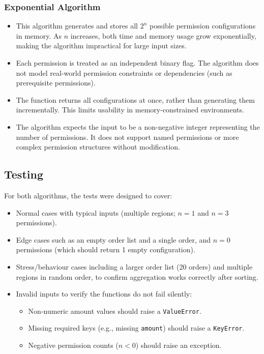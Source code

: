 \documentclass[12pt]{article}
\begin{document}
\subsubsection{Exponential Algorithm}
\begin{itemize}
	\item This algorithm generates and stores all $2^n$ possible permission configurations in memory.
	      As $n$ increases, both time and memory usage grow exponentially, making the algorithm impractical
	      for large input sizes.
	\item Each permission is treated as an independent binary flag. The algorithm does not model
	      real-world permission constraints or dependencies (such as prerequisite permissions).
	\item The function returns all configurations at once, rather than generating them incrementally. This
	      limits usability in memory-constrained environments.
	\item The algorithm expects the input to be a non-negative integer representing the number of
	      permissions. It does not support named permissions or more complex permission structures without modification.
\end{itemize}

\subsection{Testing}

For both algorithms, the tests were designed to cover:
\begin{itemize}
	\item Normal cases with typical inputs (multiple regions; $n = 1$ and $n = 3$ permissions).
	\item Edge cases such as an empty order list and a single order, and $n = 0$ permissions (which should return 1 empty configuration).
	\item Stress/behaviour cases including a larger order list (20 orders) and multiple regions in random order, to confirm aggregation works correctly after sorting.
	\item Invalid inputs to verify the functions do not fail silently:
	      \begin{itemize}
		      \item Non-numeric amount values should raise a \texttt{ValueError}.
		      \item Missing required keys (e.g., missing \texttt{amount}) should raise a \texttt{KeyError}.
		      \item Negative permission counts ($n < 0$) should raise an exception.
	      \end{itemize}
\end{itemize}
\end{document}
